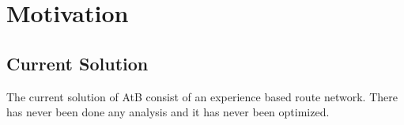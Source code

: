 \section{Motivation}
\subsection{Current Solution}

The current solution of AtB consist of an experience based route network. There has never been done any analysis and it has never been optimized. 

